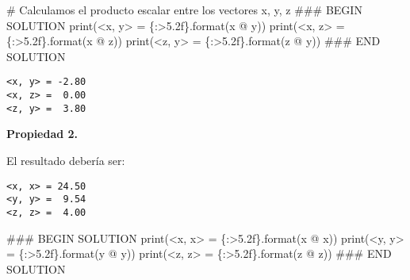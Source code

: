 \documentclass[
  letterpaper,
  DIV=11,
  numbers=noendperiod]{scrreprt}
\newenvironment{Shaded}{\begin{snugshade}}{\end{snugshade}}
\newcommand{\BuiltInTok}[1]{\textcolor[rgb]{0.00,0.23,0.31}{#1}}
\newcommand{\CommentTok}[1]{\textcolor[rgb]{0.37,0.37,0.37}{#1}}
\newcommand{\NormalTok}[1]{\textcolor[rgb]{0.00,0.23,0.31}{#1}}
\newcommand{\OperatorTok}[1]{\textcolor[rgb]{0.37,0.37,0.37}{#1}}
\newcommand{\RegionMarkerTok}[1]{\textcolor[rgb]{0.00,0.23,0.31}{#1}}
\newcommand{\SpecialCharTok}[1]{\textcolor[rgb]{0.37,0.37,0.37}{#1}}
\newcommand{\StringTok}[1]{\textcolor[rgb]{0.13,0.47,0.30}{#1}}
\begin{document}
\begin{Shaded}
\begin{Highlighting}[]
\CommentTok{\# Calculamos el producto escalar entre los vectores x, y, z}
\CommentTok{\#\#\# }\RegionMarkerTok{BEGIN}\CommentTok{ SOLUTION}
\BuiltInTok{print}\NormalTok{(}\StringTok{\textquotesingle{}\textless{}x, y\textgreater{} = }\SpecialCharTok{\{:\textgreater{}5.2f\}}\StringTok{\textquotesingle{}}\NormalTok{.}\BuiltInTok{format}\NormalTok{(x }\OperatorTok{@}\NormalTok{ y))}
\BuiltInTok{print}\NormalTok{(}\StringTok{\textquotesingle{}\textless{}x, z\textgreater{} = }\SpecialCharTok{\{:\textgreater{}5.2f\}}\StringTok{\textquotesingle{}}\NormalTok{.}\BuiltInTok{format}\NormalTok{(x }\OperatorTok{@}\NormalTok{ z))}
\BuiltInTok{print}\NormalTok{(}\StringTok{\textquotesingle{}\textless{}z, y\textgreater{} = }\SpecialCharTok{\{:\textgreater{}5.2f\}}\StringTok{\textquotesingle{}}\NormalTok{.}\BuiltInTok{format}\NormalTok{(z }\OperatorTok{@}\NormalTok{ y))}
\CommentTok{\#\#\# }\RegionMarkerTok{END}\CommentTok{ SOLUTION}
\end{Highlighting}
\end{Shaded}

\begin{verbatim}
<x, y> = -2.80
<x, z> =  0.00
<z, y> =  3.80
\end{verbatim}

\textbf{Propiedad 2.}

El resultado debería ser:

\begin{verbatim}
<x, x> = 24.50
<y, y> =  9.54
<z, z> =  4.00
\end{verbatim}

\begin{Shaded}
\begin{Highlighting}[]
\CommentTok{\#\#\# }\RegionMarkerTok{BEGIN}\CommentTok{ SOLUTION}
\BuiltInTok{print}\NormalTok{(}\StringTok{\textquotesingle{}\textless{}x, x\textgreater{} = }\SpecialCharTok{\{:\textgreater{}5.2f\}}\StringTok{\textquotesingle{}}\NormalTok{.}\BuiltInTok{format}\NormalTok{(x }\OperatorTok{@}\NormalTok{ x))}
\BuiltInTok{print}\NormalTok{(}\StringTok{\textquotesingle{}\textless{}y, y\textgreater{} = }\SpecialCharTok{\{:\textgreater{}5.2f\}}\StringTok{\textquotesingle{}}\NormalTok{.}\BuiltInTok{format}\NormalTok{(y }\OperatorTok{@}\NormalTok{ y))}
\BuiltInTok{print}\NormalTok{(}\StringTok{\textquotesingle{}\textless{}z, z\textgreater{} = }\SpecialCharTok{\{:\textgreater{}5.2f\}}\StringTok{\textquotesingle{}}\NormalTok{.}\BuiltInTok{format}\NormalTok{(z }\OperatorTok{@}\NormalTok{ z))}
\CommentTok{\#\#\# }\RegionMarkerTok{END}\CommentTok{ SOLUTION}
\end{Highlighting}
\end{Shaded}
\end{document}
